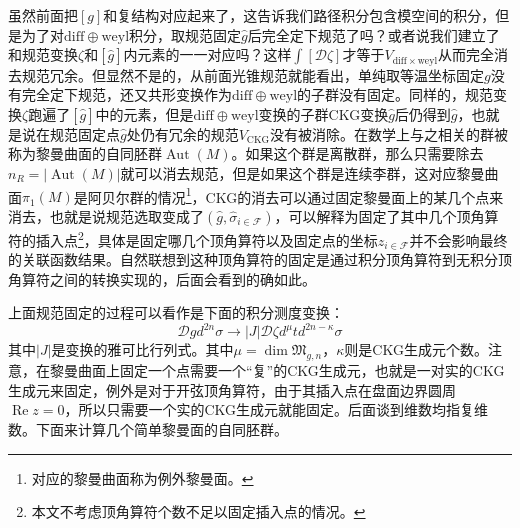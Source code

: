 虽然前面把$[g]$和复结构对应起来了，这告诉我们路径积分包含模空间的积分，但是为了对$\mathrm{diff}\oplus\mathrm{weyl}$积分，取规范固定$\hat{g}$后完全定下规范了吗？或者说我们建立了和规范变换$\zeta$和$[\hat g]$内元素的一一对应吗？这样$\int [\mathcal{D}\zeta]$才等于$V_{\mathrm{diff}\times\mathrm{weyl}}$从而完全消去规范冗余。但显然不是的，从前面光锥规范就能看出，单纯取等温坐标固定$g$没有完全定下规范，还又共形变换作为$\mathrm{diff}\oplus\mathrm{weyl}$的子群没有固定。同样的，规范变换$\zeta$跑遍了$[\hat g]$中的元素，但是$\mathrm{diff}\oplus\mathrm{weyl}$变换的子群CKG变换$\hat g$后仍得到$\hat g$，也就是说在规范固定点$\hat g$处仍有冗余的规范$V_{\mathrm{CKG}}$没有被消除。在数学上与之相关的群被称为黎曼曲面的自同胚群$\operatorname{Aut}(M)$。如果这个群是离散群，那么只需要除去$n_R=|\operatorname{Aut}(M)|$就可以消去规范，但是如果这个群是连续李群，这对应黎曼曲面$\pi_1(M)$是阿贝尔群的情况\footnote{对应的黎曼曲面称为例外黎曼面。}，CKG的消去可以通过固定黎曼面上的某几个点来消去，也就是说规范选取变成了$(\hat g,\hat\sigma_{i\in\mathcal{F}})$，可以解释为固定了其中几个顶角算符的插入点\footnote{本文不考虑顶角算符个数不足以固定插入点的情况。}，具体是固定哪几个顶角算符以及固定点的坐标$z_{i\in\mathcal{F}}$并不会影响最终的关联函数结果。自然联想到这种顶角算符的固定是通过积分顶角算符到无积分顶角算符之间的转换实现的，后面会看到的确如此。

上面规范固定的过程可以看作是下面的积分测度变换：
\begin{equation}
	\label{eq:4.4}
	\mathcal{D}gd^{2n}\sigma\to|J|\mathcal{D} \zeta d^{\mu}td^{2n-\kappa}\sigma
\end{equation}
其中$|J|$是变换的雅可比行列式。其中$\mu = \dim\mathfrak{M}_{g,n}$，$\kappa$则是CKG生成元个数。注意，在黎曼曲面上固定一个点需要一个“复”的CKG生成元，也就是一对实的CKG生成元来固定，例外是对于开弦顶角算符，由于其插入点在盘面边界圆周$\operatorname{Re}z=0$，所以只需要一个实的CKG生成元就能固定。后面谈到维数均指复维数。下面来计算几个简单黎曼面的自同胚群。

